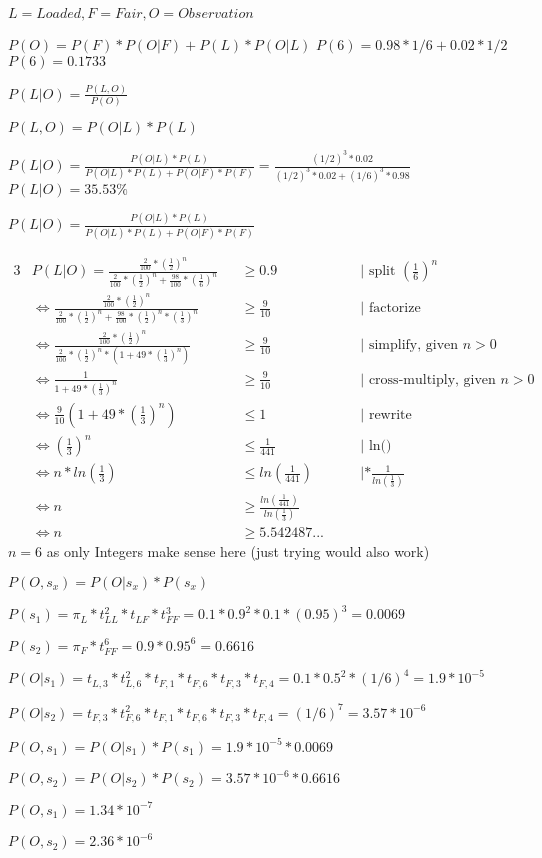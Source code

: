 $L = Loaded, F = Fair, O = Observation$

$P(O) = P(F)* P(O|F)+ P(L) * P(O|L)$
$P(6) = 0.98*1/6 + 0.02*1/2$
$P(6) = 0.1733$


$P(L|O) = \frac{P(L,O)}{P(O)}$

$P(L, O) = P(O|L) * P(L)$

$P(L|O) = \frac{P(O|L)*P(L)}{P(O|L)*P(L) + P(O|F)*P(F)} = \frac{(1/2)^3*0.02}{(1/2)^3*0.02 + (1/6)^3*0.98}$
$P(L|O) = 35.53\%$


$P(L|O) = \frac{P(O|L)*P(L)}{P(O|L)*P(L) + P(O|F)*P(F)}$

\begin{alignat}{3}
&P(L|O) = \frac{\frac{2}{100}*(\frac{1}{2})^n}{\frac{2}{100}*(\frac{1}{2})^n + \frac{98}{100}*(\frac{1}{6})^n} &&\geq 0.9 &&\quad| \text{ split } (\frac{1}{6})^n\\
&\iff \frac{\frac{2}{100}*(\frac{1}{2})^n}{\frac{2}{100}*(\frac{1}{2})^n + \frac{98}{100}*(\frac{1}{2})^n * (\frac{1}{3})^n} &&\geq \frac{9}{10}  &&\quad| \text{ factorize}\\
&\iff \frac{\frac{2}{100}*(\frac{1}{2})^n}{\frac{2}{100}*(\frac{1}{2})^n * (1 + 49 * (\frac{1}{3})^n)} &&\geq \frac{9}{10} &&\quad| \text{ simplify, given } n > 0\\
&\iff \frac{1}{1 + 49 * (\frac{1}{3})^n} &&\geq \frac{9}{10} &&\quad| \text{ cross-multiply, given } n > 0\\
&\iff \frac{9}{10} (1 + 49 * (\frac{1}{3})^n) &&\leq 1  &&\quad| \text{ rewrite }\\
&\iff (\frac{1}{3})^n &&\leq \frac{1}{441}  &&\quad| \text{ ln() }\\
&\iff n * ln(\frac{1}{3}) &&\leq ln(\frac{1}{441}) &&\quad| *\frac{1}{ln(\frac{1}{3})} \\
&\iff n &&\geq \frac{ln(\frac{1}{441})}{ln(\frac{1}{3})}\\
&\iff n &&\geq 5.542487...
\end{alignat}
$n = 6$ as only Integers make sense here (just trying would also work)


$P(O, s_x) = P(O|s_x) * P(s_x)$


$P(s_1)=\pi_L * t_{LL}^2 * t_{LF} * t_{FF}^3 = 0.1 * 0.9^2 * 0.1 * (0.95)^3 = 0.0069$

$P(s_2)=\pi_F * t_{FF}^6  = 0.9 * 0.95^6 = 0.6616$

$P(O|s_1)=t_{L,3}*t_{L,6}^2*t_{F,1}*t_{F,6}*t_{F,3}*t_{F,4} = 0.1 * 0.5^2 * (1/6)^4 = 1.9 * 10^{-5}$

$P(O|s_2)=t_{F,3}*t_{F,6}^2*t_{F,1}*t_{F,6}*t_{F,3}*t_{F,4} = (1/6)^7 = 3.57 * 10^{-6}$

$P(O,s_1)=P(O|s_1)*P(s_1)= 1.9 * 10^{-5} * 0.0069$

$P(O,s_2)=P(O|s_2)*P(s_2)= 3.57 * 10^{-6} * 0.6616$


$P(O,s_1)= 1.34 * 10^{-7}$

$P(O,s_2)= 2.36 * 10^{-6}$
